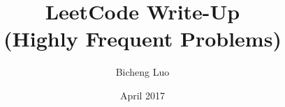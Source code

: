 \documentclass{article}
\title{LeetCode Write-Up \\(\textbf{Highly Frequent} Problems)}
\author{Bicheng Luo}
\date{April 2017}
\begin{document}
\maketitle
\pagebreak

\tableofcontents
\pagebreak





\end{document}
